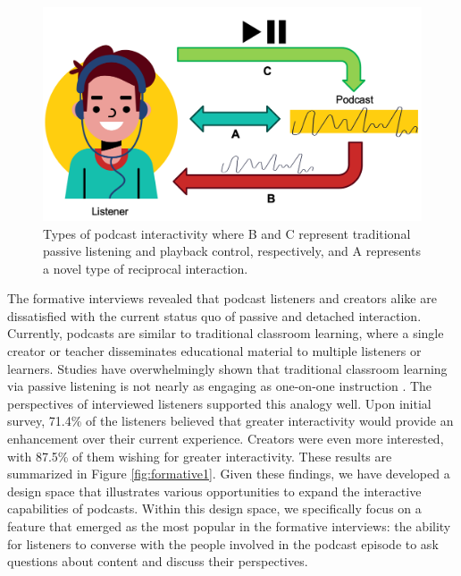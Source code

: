 \documentclass[12pt]{report}
\begin{document}
\begin{myfont}
        \begin{figure}[H]
        \centering
          \includegraphics[width=1\textwidth]{figures/interaction.png}
          \caption{Types of podcast interactivity where B and C represent traditional passive listening and playback control, respectively, and A represents a novel type of reciprocal interaction.}
          \label{fig:interaction}
        \end{figure}
        \indent The formative interviews revealed that podcast listeners and creators alike are dissatisfied with the current status quo of passive and detached interaction. Currently, podcasts are similar to traditional classroom learning, where a single creator or teacher disseminates educational material to multiple listeners or learners. Studies have overwhelmingly shown that traditional classroom learning via passive listening is not nearly as engaging as one-on-one instruction \citep{WoodTanner2012}\citep{Hanley2018}\citep{WangChristensen2020}. The perspectives of interviewed listeners supported this analogy well. Upon initial survey, 71.4\% of the listeners believed that greater interactivity would provide an enhancement over their current experience. Creators were even more interested, with 87.5\% of them wishing for greater interactivity. These results are summarized in Figure \ref{fig:formative1}. Given these findings, we have developed a design space that illustrates various opportunities to expand the interactive capabilities of podcasts. Within this design space, we specifically focus on a feature that emerged as the most popular in the formative interviews: the ability for listeners to converse with the people involved in the podcast episode to ask questions about content and discuss their perspectives.\\
        \begin{figure}[H]

\end{figure}
\end{myfont}
\end{document}
